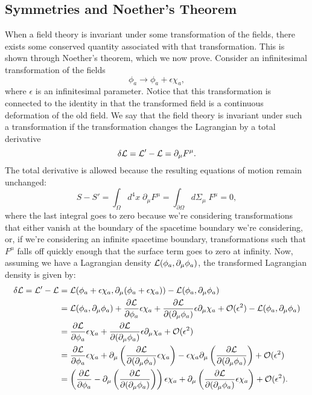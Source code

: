 \subsection{Symmetries and Noether's Theorem}
When a field theory is invariant under some transformation of the fields, there exists some conserved quantity associated with that transformation. This is shown through Noether's theorem, which we now prove. Consider an infinitesimal transformation of the fields
\[
    \phi_a\rightarrow\phi_a + \epsilon\chi_a,
\]
where $\epsilon$ is an infinitesimal parameter. Notice that this transformation is connected to the identity in that the transformed field is a continuous deformation of the old field. We say that the field theory is invariant under such a transformation if the transformation changes the Lagrangian by a total derivative
\[
    \delta\mathcal{L} = \mathcal{L}'-\mathcal{L}= \partial_\mu F^\mu.
\]
The total derivative is allowed because the resulting equations of motion remain unchanged: \[
    S - S' = \int_\Omega d^4x \;\partial_\mu F^\mu = \int_{\partial\Omega}d\Sigma_\mu\; F^\mu = 0,
\]
where the last integral goes to zero because we're considering transformations that either vanish at the boundary of the spacetime boundary we're considering, or, if we're considering an infinite spacetime boundary, transformations such that $F^\mu$ falls off quickly enough that the surface term goes to zero at infinity. Now, assuming we have a Lagrangian density $\mathcal{L}(\phi_a, \partial_\mu\phi_a)$, the transformed Lagrangian density is given by:
\begin{align*}
    \delta\mathcal{L} = \mathcal{L}' - \mathcal{L} &= \mathcal{L}(\phi_a+\epsilon\chi_a, \partial_\mu(\phi_a + \epsilon\chi_a)) - \mathcal{L}(\phi_a, \partial_\mu\phi_a)\\
    & = \mathcal{L}(\phi_a, \partial_\mu\phi_a) + \frac{\partial\mathcal{L}}{\partial\phi_a}\epsilon\chi_a + \frac{\partial\mathcal{L}}{\partial(\partial_\mu\phi_a)}\epsilon\partial_\mu\chi_a + \mathcal{O}(\epsilon^2) - \mathcal{L}(\phi_a,\partial_\mu\phi_a)\\
    & = \frac{\partial\mathcal{L}}{\partial\phi_a}\epsilon\chi_a + \frac{\partial\mathcal{L}}{\partial(\partial_\mu\phi_a)}\epsilon\partial_\mu\chi_a +\mathcal{O}(\epsilon^2)\\
    & = \frac{\partial\mathcal{L}}{\partial\phi_a}\epsilon\chi_a+\partial_\mu\left(\frac{\partial\mathcal{L}}{\partial(\partial_\mu\phi_a)}\epsilon\chi_a\right)-\epsilon\chi_a\partial_\mu\left(\frac{\partial\mathcal{L}}{\partial(\partial_\mu\phi_a)}\right) + \mathcal{O}(\epsilon^2)\\
    & = \left( \frac{\partial\mathcal{L}}{\partial\phi_a} - \partial_\mu\left(\frac{\partial\mathcal{L}}{\partial(\partial_\mu\phi_a)}\right)\right)\epsilon\chi_a + \partial_\mu\left(\frac{\partial\mathcal{L}}{\partial(\partial_\mu\phi_a)}\epsilon\chi_a\right) + \mathcal{O}(\epsilon^2).
\end{align*}
